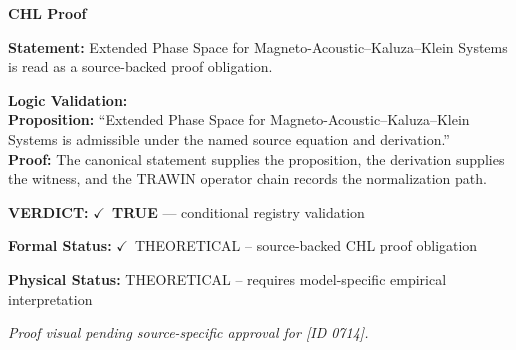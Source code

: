 \vspace{0.45em}
\noindent\textbf{CHL Proof}\par
\textbf{Statement:} Extended Phase Space for Magneto-Acoustic--Kaluza--Klein Systems is read as a source-backed proof obligation.

\textbf{Logic Validation:}\\
\textbf{Proposition:} ``Extended Phase Space for Magneto-Acoustic--Kaluza--Klein Systems is admissible under the named source equation and derivation.''\\
\textbf{Proof:} The canonical statement supplies the proposition, the derivation supplies the witness, and the TRAWIN operator chain records the normalization path.

\textbf{VERDICT:} \ensuremath{\checkmark}\ \textbf{TRUE} --- conditional registry validation

\textbf{Formal Status:} \ensuremath{\checkmark}\ THEORETICAL -- source-backed CHL proof obligation

\textbf{Physical Status:} THEORETICAL -- requires model-specific empirical interpretation
\par\vspace{0.45em}
\par
\vfill
\begingroup\footnotesize\itshape
Proof visual pending source-specific approval for [ID 0714].
\par\endgroup
\vfill
\endgroup
\endgroup
